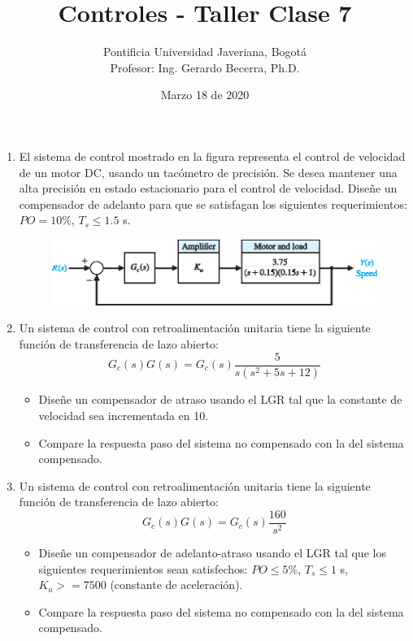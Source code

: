 \documentclass[11pt, spanish]{article}
\title{Controles - Taller Clase 7}
\author{Pontificia Universidad Javeriana, Bogotá\\Profesor: Ing. Gerardo Becerra, Ph.D.}
\date{Marzo 18 de 2020}
\begin{document}
	\maketitle

\begin{enumerate}

 	\item El sistema de control mostrado en la figura representa el control de velocidad de un motor DC, usando un tacómetro de precisión. Se desea mantener una alta precisión en estado estacionario para el control de velocidad. Diseñe un compensador de adelanto para que se satisfagan los siguientes requerimientos: $PO = 10\%$, $T_s \leq 1.5$ s.
	 \begin{figure}[h]
	 	\centering
	 	\includegraphics[width=13cm]{taller_ejericio1.eps}
	 \end{figure}

	\item Un sistema de control con retroalimentación unitaria tiene la siguiente función de transferencia de lazo abierto:
		\begin{equation*}
			G_c(s)G(s) = G_c(s)\frac{5}{s(s^2+5s+12)}
		\end{equation*}
		\begin{itemize}
			\item Diseñe un compensador de atraso usando el LGR tal que la constante de velocidad sea incrementada en 10.
			\item Compare la respuesta paso del sistema no compensado con la del sistema compensado.
		\end{itemize}

	\item Un sistema de control con retroalimentación unitaria tiene la siguiente función de transferencia de lazo abierto:
		\begin{equation*}
			G_c(s)G(s) = G_c(s)\frac{160}{s^2}
		\end{equation*}
		\begin{itemize}
			\item Diseñe un compensador de adelanto-atraso usando el LGR tal que los siguientes requerimientos sean satisfechos: $PO \leq 5\%$, $T_s \leq 1$ s, $K_a >= 7500$ (constante de aceleración).
			\item Compare la respuesta paso del sistema no compensado con la del sistema compensado.
		\end{itemize}
 
\end{enumerate}
\end{document}
